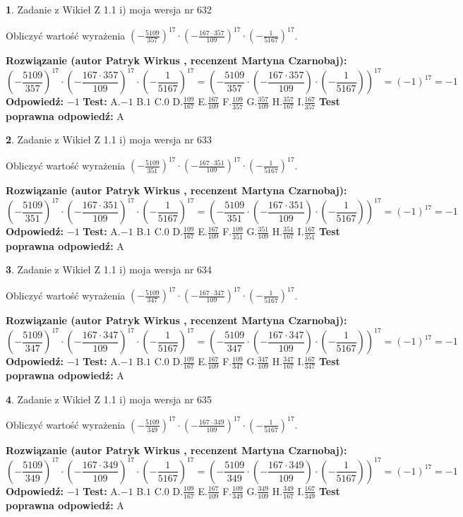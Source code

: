 \documentclass[12pt, a4paper]{article}
\theoremstyle{definition} %
\newtheorem{zad}{}
\newcommand{\zadStart}[1]{\begin{zad}#1\newline}
\newcommand{\zadStop}{\end{zad}}
\newcommand{\rozwStart}[2]{\noindent \textbf{Rozwiązanie (autor #1 , recenzent #2): }\newline}
\newcommand{\rozwStop}{\newline}
\newcommand{\odpStart}{\noindent \textbf{Odpowiedź:}\newline}
\newcommand{\odpStop}{\newline}
\newcommand{\testStart}{\noindent \textbf{Test:}\newline}
\newcommand{\testStop}{\newline}
\newcommand{\kluczStart}{\noindent \textbf{Test poprawna odpowiedź:}\newline}
\newcommand{\kluczStop}{\newline}
\begin{document}
\zadStart{Zadanie z Wikieł Z 1.1 i) moja wersja nr 632}

Obliczyć wartość wyrażenia $(-\frac{5109}{357})^{17} \cdot (-\frac{167 \cdot 357}{109})^{17} \cdot (-\frac{1}{5167})^{17}$.
\zadStop
\rozwStart{Patryk Wirkus}{Martyna Czarnobaj}
$$(-\frac{5109}{357})^{17} \cdot (-\frac{167 \cdot 357}{109})^{17} \cdot (-\frac{1}{5167})^{17} = (-\frac{5109}{357} \cdot (-\frac{167 \cdot 357}{109}) \cdot (-\frac{1}{5167}))^{17} = (-1)^{17} = -1$$
\rozwStop
\odpStart
$-1$
\odpStop
\testStart
A.$-1$ B.$1$ C.$0$ D.$\frac{109}{167}$ E.$\frac{167}{109}$
F.$\frac{109}{357}$ G.$\frac{357}{109}$
H.$\frac{357}{167}$
I.$\frac{167}{357}$
\testStop
\kluczStart
A
\kluczStop



\zadStart{Zadanie z Wikieł Z 1.1 i) moja wersja nr 633}

Obliczyć wartość wyrażenia $(-\frac{5109}{351})^{17} \cdot (-\frac{167 \cdot 351}{109})^{17} \cdot (-\frac{1}{5167})^{17}$.
\zadStop
\rozwStart{Patryk Wirkus}{Martyna Czarnobaj}
$$(-\frac{5109}{351})^{17} \cdot (-\frac{167 \cdot 351}{109})^{17} \cdot (-\frac{1}{5167})^{17} = (-\frac{5109}{351} \cdot (-\frac{167 \cdot 351}{109}) \cdot (-\frac{1}{5167}))^{17} = (-1)^{17} = -1$$
\rozwStop
\odpStart
$-1$
\odpStop
\testStart
A.$-1$ B.$1$ C.$0$ D.$\frac{109}{167}$ E.$\frac{167}{109}$
F.$\frac{109}{351}$ G.$\frac{351}{109}$
H.$\frac{351}{167}$
I.$\frac{167}{351}$
\testStop
\kluczStart
A
\kluczStop



\zadStart{Zadanie z Wikieł Z 1.1 i) moja wersja nr 634}

Obliczyć wartość wyrażenia $(-\frac{5109}{347})^{17} \cdot (-\frac{167 \cdot 347}{109})^{17} \cdot (-\frac{1}{5167})^{17}$.
\zadStop
\rozwStart{Patryk Wirkus}{Martyna Czarnobaj}
$$(-\frac{5109}{347})^{17} \cdot (-\frac{167 \cdot 347}{109})^{17} \cdot (-\frac{1}{5167})^{17} = (-\frac{5109}{347} \cdot (-\frac{167 \cdot 347}{109}) \cdot (-\frac{1}{5167}))^{17} = (-1)^{17} = -1$$
\rozwStop
\odpStart
$-1$
\odpStop
\testStart
A.$-1$ B.$1$ C.$0$ D.$\frac{109}{167}$ E.$\frac{167}{109}$
F.$\frac{109}{347}$ G.$\frac{347}{109}$
H.$\frac{347}{167}$
I.$\frac{167}{347}$
\testStop
\kluczStart
A
\kluczStop



\zadStart{Zadanie z Wikieł Z 1.1 i) moja wersja nr 635}

Obliczyć wartość wyrażenia $(-\frac{5109}{349})^{17} \cdot (-\frac{167 \cdot 349}{109})^{17} \cdot (-\frac{1}{5167})^{17}$.
\zadStop
\rozwStart{Patryk Wirkus}{Martyna Czarnobaj}
$$(-\frac{5109}{349})^{17} \cdot (-\frac{167 \cdot 349}{109})^{17} \cdot (-\frac{1}{5167})^{17} = (-\frac{5109}{349} \cdot (-\frac{167 \cdot 349}{109}) \cdot (-\frac{1}{5167}))^{17} = (-1)^{17} = -1$$
\rozwStop
\odpStart
$-1$
\odpStop
\testStart
A.$-1$ B.$1$ C.$0$ D.$\frac{109}{167}$ E.$\frac{167}{109}$
F.$\frac{109}{349}$ G.$\frac{349}{109}$
H.$\frac{349}{167}$
I.$\frac{167}{349}$
\testStop
\kluczStart
A
\kluczStop
\end{document}
